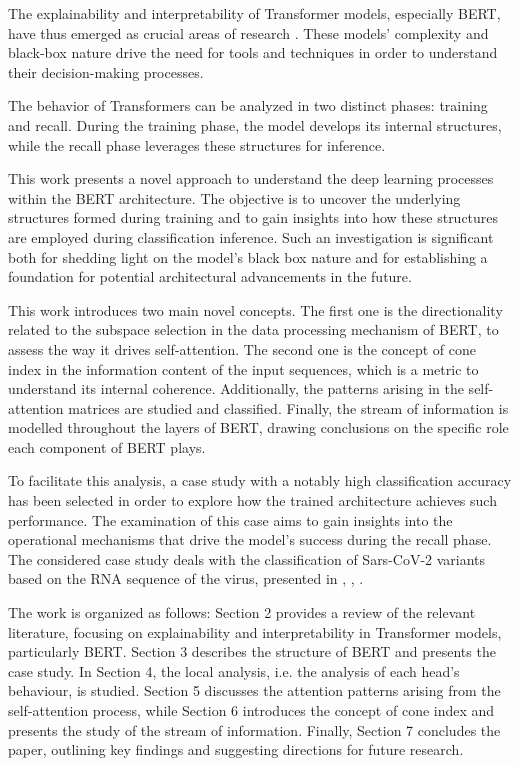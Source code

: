 \documentclass[11pt,a4paper,reqno]{amsart} %
\theoremstyle{definition}
\numberwithin{equation}{section}          %
\begin{document}
The explainability and interpretability of Transformer models, especially BERT, have thus emerged as crucial areas of research \cite{kamath2022transformers}. These models' complexity and black-box nature drive the need for tools and techniques in order to understand their decision-making processes.  

The behavior of Transformers can be analyzed in two distinct phases: training and recall. During the training phase, the model develops its internal structures, while the recall phase leverages these structures for inference. 

This work presents a novel approach to understand the deep learning processes within the BERT architecture. The objective is to uncover the underlying structures formed during training and to gain insights into how these structures are employed during classification inference. Such an investigation is significant both for shedding light on the model's black box nature and for establishing a foundation for potential architectural advancements in the future.

This work introduces two main novel concepts. The first one is the directionality related to the subspace selection in the data processing mechanism of BERT, to assess the way it drives self-attention.
The second one is the concept of cone index in the information content of the input sequences, which is a metric to understand its internal coherence. Additionally, the patterns arising in the self-attention matrices are studied and classified. Finally, the stream of information is modelled throughout the layers of BERT, drawing conclusions on the specific role each component of BERT plays.

To facilitate this analysis, a case study with a notably high classification accuracy has been selected in order to explore how the trained architecture achieves such performance. The examination of this case aims to gain insights into the operational mechanisms that drive the model's success during the recall phase. The considered case study deals with the classification of Sars-CoV-2 variants based on the RNA sequence of the virus, presented in \cite{ghione2022interpretable}, \cite{Ghione2023}, \cite{articoloIEEEAccess}.

The work is organized as follows: Section 2 provides a review of the relevant literature, focusing on explainability and interpretability in Transformer models, particularly BERT. Section 3 describes the structure of BERT and presents the case study. In Section 4, the local analysis, i.e. the analysis of each head's behaviour, is studied. Section 5 discusses the attention patterns arising from the self-attention process, while Section 6 introduces the concept of cone index and presents the study of the stream of information. Finally, Section 7 concludes the paper, outlining key findings and suggesting directions for future research.
\end{document}

